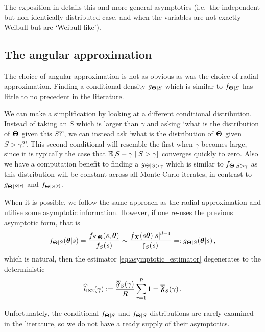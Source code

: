 The exposition in \cite{asmussen2017tail} details this and more general asymptotics (i.e.\ the independent but non-identically distributed case, and when the variables are not exactly Weibull but are `Weibull-like').

\subsection{The angular approximation}

The choice of angular approximation is not as obvious as was the choice of radial approximation.
Finding a conditional density $g_{\bm{\Theta} \mid S}$ which is similar to $f_{\bm{\Theta} \mid S}$ has little to no precedent in the literature.

We can make a simplification by looking at a different conditional distribution. Instead of taking an $S$ which is larger than $\gamma$ and asking `what is the distribution of $\bm{\Theta}$ given this $S$?', we can instead ask `what is the distribution of $\bm{\Theta}$ given $S > \gamma$?'. This second conditional will resemble the first when $\gamma$ becomes large, since it is typically the case that $\operatorname{{\mathbb E}}[ S-\gamma \mid S > \gamma]$ converges quickly to zero.
Also we have a computation benefit to finding a $g_{\bm{\Theta} \mid S > \gamma}$ which is similar to $f_{\bm{\Theta} \mid S > \gamma}$ as this distribution will be constant across all Monte Carlo iterates, in contrast to $g_{\bm{\Theta} \mid S^{[r]}}$ and $f_{\bm{\Theta} \mid S^{[r]}}$.

When it is possible, we follow the same approach as the radial approximation and utilise some asymptotic information. However, if one re-uses the previous asymptotic form, that is
\[ f_{\bm{\Theta} \mid S}(\bm{\theta} | s) = \frac{f_{S,\bm{\Theta}}(s, \bm{\theta})}{f_S(s)} \sim \frac{f_{\bm{X}}(s \bm{\theta}) |s|^{d-1}}{\mathfrak{f}_S(s)} =: g_{\bm{\Theta} \mid S}(\bm{\theta} | s) \,, \]
which is natural, then the estimator \eqref{eq:asymptotic_estimator} degenerates to the deterministic
\begin{equation*} \label{eq:double_asymptotic_estimator}
\widehat{l}_{\mathrm{IS2}}(\gamma) := \frac{\overline{\mathfrak{F}}_S(\gamma)}{R} \sum_{r=1}^R 1 = \overline{\mathfrak{F}}_S(\gamma) \,.
\end{equation*}

Unfortunately, the conditional $f_{\bm{\Theta} \mid S}$ and $f_{\bm{\Theta} \mid S}$ distributions are rarely examined in the literature, so we do not have a ready supply of their asymptotics.

